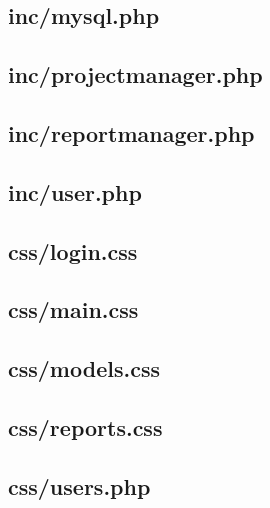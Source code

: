 \documentclass[11pt,a4paper,spanish,twoside]{book}
\begin{document}
\subsection{inc/mysql.php}


\subsection{inc/projectmanager.php}


\subsection{inc/reportmanager.php}


\subsection{inc/user.php}


\subsection{css/login.css}


\subsection{css/main.css}


\subsection{css/models.css}


\subsection{css/reports.css}


\subsection{css/users.php}


\appendix
\end{document}
